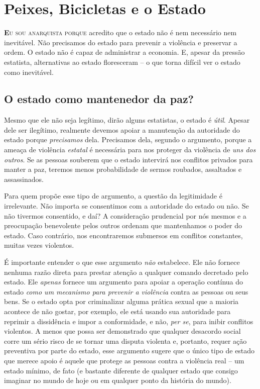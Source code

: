 
\chapter{Peixes, Bicicletas e o Estado}
\label{chap:2}

\lettrine[lines=2]{\textcolor{LettrineColor}{\textbf{E}}}{u sou anarquista porque} acredito que o estado não é nem necessário nem inevitável. Não precisamos do estado para prevenir a violência e preservar a ordem. O estado não é capaz de administrar a economia. E, apesar da pressão estatista, alternativas ao estado floresceram -- o que torna difícil ver o estado como inevitável.

\section{O estado como mantenedor da paz?}

Mesmo que ele não seja legítimo, dirão alguns estatistas, o estado é \emph{útil}. Apesar dele ser ilegítimo, realmente devemos apoiar a manutenção da autoridade do estado porque \emph{precisamos} dela. Precisamos dela, segundo o argumento, porque a ameaça de violência \emph{estatal} é necessária para nos proteger da violência de \emph{uns dos outros}. Se as pessoas souberem que o estado intervirá nos conflitos privados para manter a paz, teremos menos probabilidade de sermos roubados, assaltados e assassinados.

Para quem propõe esse tipo de argumento, a questão da legitimidade é irrelevante. Não importa se consentimos com a autoridade do estado ou não. Se não tivermos consentido, e daí? A consideração prudencial por nós mesmos e a preocupação benevolente pelos outros ordenam que mantenhamos o poder do estado. Caso contrário, nos encontraremos submersos em conflitos constantes, muitas vezes violentos.

É importante entender o que esse argumento \emph{não} estabelece. Ele não fornece nenhuma razão direta para prestar atenção a qualquer comando decretado pelo estado. Ele \emph{apenas} fornece um argumento para apoiar a operação contínua do estado \emph{como um mecanismo para prevenir a violência} contra as pessoas ou seus bens. Se o estado opta por criminalizar alguma prática sexual que a maioria acontece de não gostar, por exemplo, ele está usando sua autoridade para reprimir a dissidência e impor a conformidade, e não, \emph{per se}, para inibir conflitos violentos. A menos que possa ser demonstrado que qualquer desacordo social corre um sério risco de se tornar uma disputa violenta e, portanto, requer ação preventiva por parte do estado, esse argumento sugere que o único tipo de estado que merece apoio é aquele que protege as pessoas contra a violência real -- um estado mínimo, de fato (e bastante diferente de qualquer estado que consigo imaginar no mundo de hoje ou em qualquer ponto da história do mundo).

